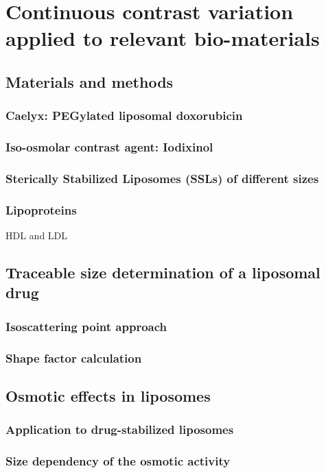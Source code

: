\chapter{Continuous contrast variation applied to relevant bio-materials}
\label{chap:bio_applications}
\blindtext[1]\cite{ballauff_saxs_2001-1}

\section{Materials and methods}
\subsection{Caelyx: PEGylated liposomal doxorubicin}
\subsection{Iso-osmolar contrast agent: Iodixinol}
\subsection{Sterically Stabilized Liposomes (SSLs) of different sizes}
\subsection{Lipoproteins}
HDL and LDL

\section{Traceable size determination of a liposomal drug}
\subsection{Isoscattering point approach}
\subsection{Shape factor calculation}

\section{Osmotic effects in liposomes}
\subsection{Application to drug-stabilized liposomes}
\subsection{Size dependency of the osmotic activity}

